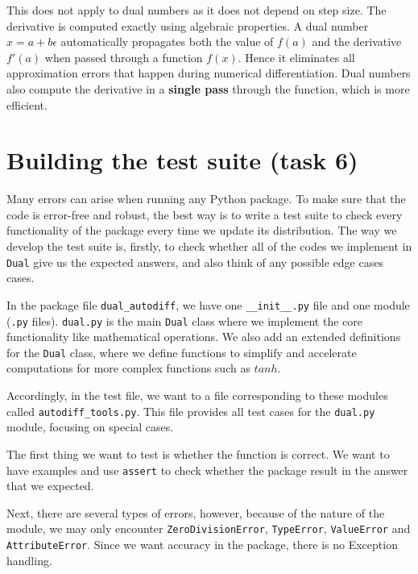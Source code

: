 \documentclass[12.5pt]{article}
\begin{document}
This does not apply to dual numbers as it does not depend on step size. The derivative is computed exactly using algebraic properties. A dual number \(x = a + b\epsilon\) automatically propagates both the value of \(f(a)\) and the derivative \(f'(a)\) when passed through a function \(f(x)\). Hence it eliminates all approximation errors that happen during numerical differentiation. Dual numbers also compute the derivative in a \textbf{single pass} through the function, which is more efficient.

\newpage
\section{Building the test suite (task 6)}
Many errors can arise when running any Python package. To make sure that the code is error-free and robust, the best way is to write a test suite to check every functionality of the package every time we update its distribution. The way we develop the test suite is, firstly, to check whether all of the codes we implement in \texttt{Dual} give us the expected answers, and also think of any possible edge cases cases.

In the package file \texttt{dual\_autodiff}, we have one \texttt{\_\_init\_\_.py} file and one module (\texttt{.py} files). \texttt{dual.py} is the main \texttt{Dual} class where we implement the core functionality like mathematical operations. We also add an extended definitions for the \texttt{Dual} class, where we define functions to simplify and accelerate computations for more complex functions such as \(tanh\).

Accordingly, in the test file, we want to a file corresponding to these modules called \texttt{autodiff\_tools.py}. This file provides all test cases for the \texttt{dual.py} module, focusing on special cases.

The first thing we want to test is whether the function is correct. We want to have examples and use \texttt{assert} to check whether the package result in the answer that we expected.

Next, there are several types of errors, however, because of the nature of the module, we may only encounter \texttt{ZeroDivisionError}, \texttt{TypeError}, \texttt{ValueError} and \texttt{AttributeError}. Since we want accuracy in the package, there is no Exception handling.
\end{document}
